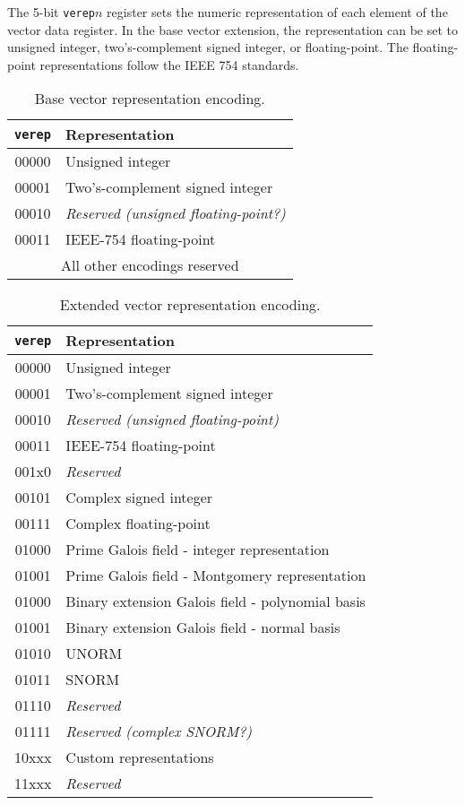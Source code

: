 The 5-bit {\tt verep}$n$ register sets the numeric representation of
each element of the vector data register.  In the base vector
extension, the representation can be set to unsigned integer,
two's-complement signed integer, or floating-point.  The
floating-point representations follow the IEEE 754 standards.

\begin{table}[hbtp]
  \centering
  \begin{tabular}{|c|l|}
    \hline
    {\tt verep} & Representation \\
    \hline
    00000 & Unsigned integer \\
    00001 & Two's-complement signed integer \\
    00010 & {\em Reserved (unsigned floating-point?)}\\
    00011 & IEEE-754 floating-point \\
    \hline
    \multicolumn{2}{|c|}{All other encodings reserved}\\
    \hline
  \end{tabular}
  \caption{Base vector representation encoding.}
  \label{tab:verep}
\end{table}

\begin{table}[hbtp]
  \centering
  \begin{tabular}{|c|l|}
    \hline
    {\tt verep} & Representation \\
    \hline
    00000 & Unsigned integer \\
    00001 & Two's-complement signed integer \\
    00010 & {\em Reserved (unsigned floating-point)}\\
    00011 & IEEE-754 floating-point \\
    \hline
    001x0 & {\em Reserved} \\
    00101 & Complex signed integer \\
    00111 & Complex floating-point \\
    \hline
    01000 & Prime Galois field - integer representation \\
    01001 & Prime Galois field - Montgomery representation \\
    01000 & Binary extension Galois field - polynomial basis \\
    01001 & Binary extension Galois field - normal basis \\
    \hline
    01010 & UNORM \\
    01011 & SNORM \\
    01110 & {\em Reserved} \\
    01111 & {\em Reserved (complex SNORM?)} \\
    \hline
    10xxx & Custom representations \\
    \hline
    11xxx & {\em Reserved} \\
    \hline
  \end{tabular}
  \caption{Extended vector representation encoding.}
  \label{tab:extverep}
\end{table}

